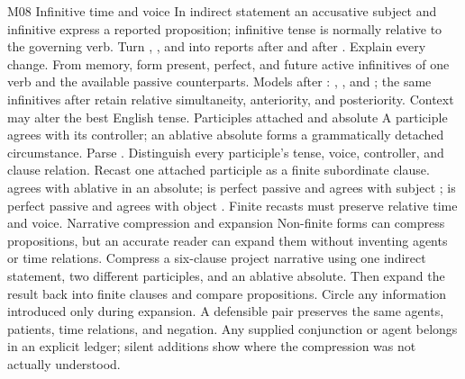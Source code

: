 \begin{courseunit}{M08}
\SubmoduleExtension
  {Infinitive time and voice}
  {In indirect statement an accusative subject and infinitive express a
  reported proposition; infinitive tense is normally relative to the
  governing verb.}
  {Turn , , and 
  into reports after  and after .  Explain every
  change.}
  {From memory, form present, perfect, and future active infinitives of one
  verb and the available passive counterparts.}
  {Models after : , ,
  and ; the same infinitives after 
  retain relative simultaneity, anteriority, and posteriority.  Context may
  alter the best English tense.}
\SubmoduleExtension
  {Participles attached and absolute}
  {A participle agrees with its controller; an ablative absolute forms a
  grammatically detached circumstance.}
  {Parse .  Distinguish every participle's tense,
  voice, controller, and clause relation.}
  {Recast one attached participle as a finite subordinate clause.}
  { agrees with ablative  in an absolute;
   is perfect passive and agrees with subject ;
   is perfect passive and agrees with object .
  Finite recasts must preserve relative time and voice.}
\SubmoduleExtension
  {Narrative compression and expansion}
  {Non-finite forms can compress propositions, but an accurate reader can
  expand them without inventing agents or time relations.}
  {Compress a six-clause project narrative using one indirect statement, two
  different participles, and an ablative absolute.  Then expand the result
  back into finite clauses and compare propositions.}
  {Circle any information introduced only during expansion.}
  {A defensible pair preserves the same agents, patients, time relations, and
  negation.  Any supplied conjunction or agent belongs in an explicit ledger;
  silent additions show where the compression was not actually understood.}
\end{courseunit}


